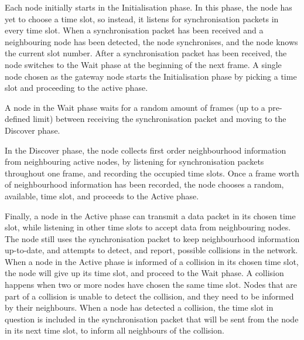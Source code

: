 \begin{description}[style=nextline]
    \item[Initialisation] Each node initially starts in the Initialisation phase. In this phase, the node has
          yet to choose a time slot, so instead, it listens for synchronisation packets in every time slot.
          When a synchronisation packet has been received and a neighbouring node has been detected, the node
          synchronises, and the node knows the current slot number. After a synchronisation packet has been
          received, the node switches to the Wait phase at the beginning of the next frame. A single node
          chosen as the gateway node starts the Initialisation phase by picking a time slot and proceeding to
          the active phase.
    \item[Wait] A node in the Wait phase waits for a random amount of frames (up to a pre-defined limit) between
          receiving the synchronisation packet and moving to the Discover phase.
    \item[Discover] In the Discover phase, the node collects first order neighbourhood information from
          neighbouring active nodes, by listening for synchronisation packets throughout one frame, and
          recording the occupied time slots. Once a frame worth of neighbourhood information has been
          recorded, the node chooses a random, available, time slot, and proceeds to the Active phase.
    \item[Active] Finally, a node in the Active phase can transmit a data packet in its chosen time
          slot, while listening in other time slots to accept data from neighbouring nodes. The node still
          uses the synchronisation packet to keep neighbourhood information up-to-date, and attempts to
          detect, and report, possible collisions in the network. When a node in the Active phase is informed
          of a collision in its chosen time slot, the node will give up its time slot, and proceed to the Wait
          phase. A collision happens when two or more nodes have chosen the same time slot. Nodes that are
          part of a collision is unable to detect the collision, and they need to be informed by their
          neighbours. When a node has detected a collision, the time slot in question is included in the
          synchronisation packet that will be sent from the node in its next time slot, to inform all
          neighbours of the collision.
\end{description}

